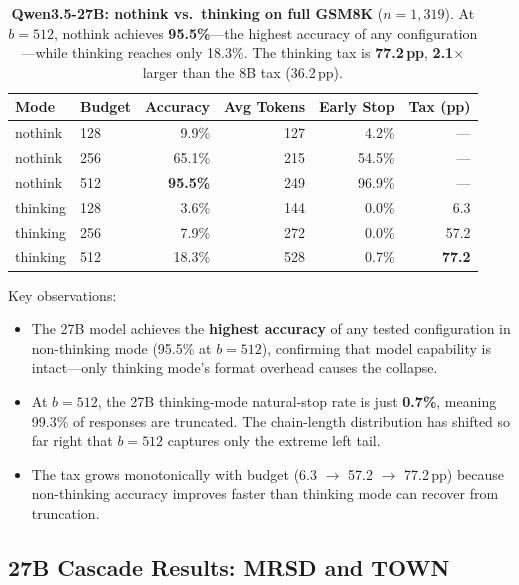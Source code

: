 \begin{table}[ht]
\centering
\caption{\textbf{Qwen3.5-27B: nothink vs.\ thinking on full GSM8K}
($n{=}1{,}319$).
At $b{=}512$, nothink achieves \textbf{95.5\%}---the highest
accuracy of any configuration---while thinking reaches only 18.3\%.
The thinking tax is \textbf{77.2\,pp}, \textbf{2.1$\times$} larger
than the 8B tax (36.2\,pp).}
\label{tab:27b-both-modes}
\small
\begin{tabular}{llrrrr}
\toprule
\textbf{Mode} & \textbf{Budget} & \textbf{Accuracy} & \textbf{Avg Tokens} & \textbf{Early Stop} & \textbf{Tax (pp)} \\
\midrule
nothink & 128 & 9.9\% & 127 & 4.2\% & --- \\
nothink & 256 & 65.1\% & 215 & 54.5\% & --- \\
nothink & 512 & \textbf{95.5\%} & 249 & 96.9\% & --- \\
\midrule
thinking & 128 & 3.6\% & 144 & 0.0\% & 6.3 \\
thinking & 256 & 7.9\% & 272 & 0.0\% & 57.2 \\
thinking & 512 & 18.3\% & 528 & 0.7\% & \textbf{77.2} \\
\bottomrule
\end{tabular}
\end{table}

\noindent
Key observations:
\begin{itemize}[nosep,leftmargin=*]
\item The 27B model achieves the \textbf{highest accuracy} of any tested
  configuration in non-thinking mode (95.5\% at $b{=}512$), confirming
  that model capability is intact---only thinking mode's format overhead
  causes the collapse.
\item At $b{=}512$, the 27B thinking-mode natural-stop rate is just
  \textbf{0.7\%}, meaning 99.3\% of responses are truncated.
  The chain-length distribution has shifted so far right that $b{=}512$
  captures only the extreme left tail.
\item The tax grows monotonically with budget (6.3 $\to$ 57.2 $\to$ 77.2\,pp)
  because non-thinking accuracy improves faster than thinking mode can
  recover from truncation.
\end{itemize}

\subsection{27B Cascade Results: MRSD and TOWN}
\label{app:27b-cascade}

